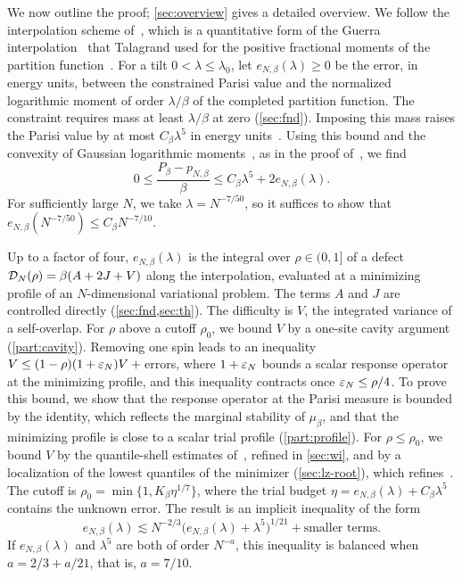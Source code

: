 We now outline the proof; \cref{sec:overview} gives a detailed
overview. We follow the interpolation scheme of~\cite{AL}, which is a
quantitative form of the Guerra interpolation~\cite{Guerra2003} that
Talagrand used for the positive fractional moments of the partition
function~\cite{Talagrand2007FractionalMoments}. For a tilt
$0<\lambda\le\lambda_0$, let $e_{N,\beta}(\lambda)\ge0$ be the error,
in energy units, between the constrained Parisi value and the normalized
logarithmic moment of order $\lambda/\beta$ of the completed partition
function. The constraint requires mass at least $\lambda/\beta$ at zero
(\cref{sec:fnd}).
Imposing this mass raises the Parisi value by at most
$C_\beta\lambda^5$ in energy units~\cite[Lemma~7.2]{AL}. Using this
bound and the convexity of Gaussian logarithmic
moments~\cite[Theorem~1]{ChenConvexity}, as in the proof
of~\cite[Theorem~7.8, Step~1]{AL}, we find
\[
 0\le\frac{P_\beta-p_{N,\beta}}{\beta}
 \le C_\beta\lambda^5+2e_{N,\beta}(\lambda).
\]
For sufficiently large $N$, we take $\lambda=N^{-7/50}$, so it
suffices to show that
$e_{N,\beta}(N^{-7/50})\le C_\beta N^{-7/10}$.

Up to a factor of four, $e_{N,\beta}(\lambda)$ is the integral over
$\rho\in(0,1]$ of a defect $\mathcal D_N(\rho)=\beta(A+2J+V)$ along the
interpolation, evaluated at a minimizing profile of an $N$-dimensional
variational problem. The terms $A$ and $J$ are controlled directly
(\cref{sec:fnd,sec:th}). The difficulty is $V$, the integrated variance
of a self-overlap. For $\rho$ above a cutoff $\rho_0$, we bound $V$ by
a one-site cavity argument (\cref{part:cavity}). Removing one spin leads
to an inequality $V\le(1-\rho)(1+\varepsilon_N)V+{}$errors, where
$1+\varepsilon_N$ bounds a scalar response operator at the minimizing profile,
and this inequality contracts once $\varepsilon_N\le\rho/4$. To prove this
bound, we show that the response operator at the Parisi measure is
bounded by the identity, which reflects the marginal stability of
$\mu_\beta$, and that the minimizing profile is close to a scalar trial
profile (\cref{part:profile}). For $\rho\le\rho_0$, we bound $V$ by
the quantile-shell estimates of~\cite[Section~3]{AL}, refined in
\cref{sec:wi}, and by a localization of the lowest quantiles of the
minimizer (\cref{sec:lz-root}), which refines~\cite[Lemma~7.6]{AL}. The cutoff is
$\rho_0=\min\{1,K_\beta\eta^{1/7}\}$, where the trial budget
$\eta=e_{N,\beta}(\lambda)+C_\beta\lambda^5$ contains the unknown error.
The result is an implicit inequality of the form
\[
 e_{N,\beta}(\lambda)\lesssim N^{-2/3}
 \bigl(e_{N,\beta}(\lambda)+\lambda^5\bigr)^{1/21}+\text{smaller terms}.
\]
If $e_{N,\beta}(\lambda)$ and $\lambda^5$ are both of order $N^{-a}$,
this inequality is balanced when $a=2/3+a/21$, that is, $a=7/10$.


